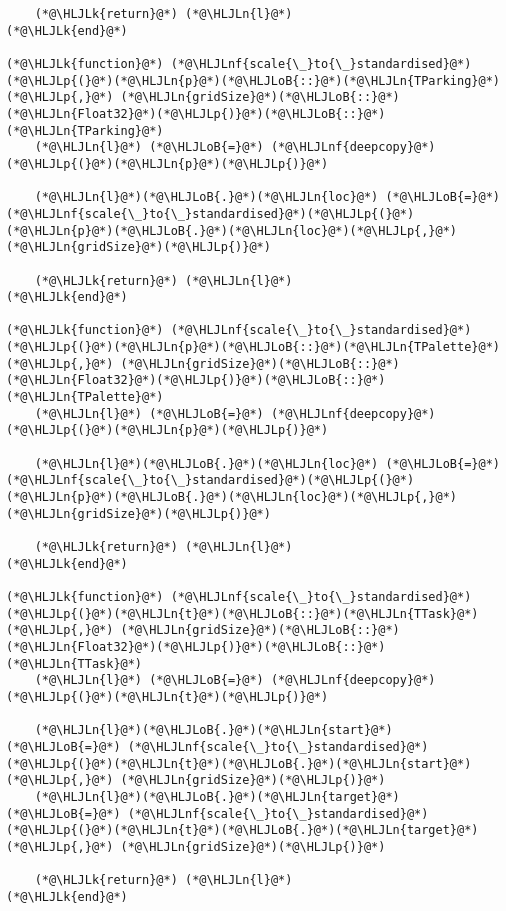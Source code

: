 \documentclass[12pt,a4paper]{article}
\newcommand{\HLJLk}[1]{\textcolor[RGB]{148,91,176}{\textbf{#1}}}
\newcommand{\HLJLn}[1]{#1}
\newcommand{\HLJLnf}[1]{\textcolor[RGB]{66,102,213}{#1}}
\newcommand{\HLJLoB}[1]{\textcolor[RGB]{102,102,102}{\textbf{#1}}}
\newcommand{\HLJLp}[1]{#1}
\begin{document}
\begin{lstlisting}
    (*@\HLJLk{return}@*) (*@\HLJLn{l}@*)
(*@\HLJLk{end}@*)

(*@\HLJLk{function}@*) (*@\HLJLnf{scale{\_}to{\_}standardised}@*)(*@\HLJLp{(}@*)(*@\HLJLn{p}@*)(*@\HLJLoB{::}@*)(*@\HLJLn{TParking}@*)(*@\HLJLp{,}@*) (*@\HLJLn{gridSize}@*)(*@\HLJLoB{::}@*)(*@\HLJLn{Float32}@*)(*@\HLJLp{)}@*)(*@\HLJLoB{::}@*)(*@\HLJLn{TParking}@*)
    (*@\HLJLn{l}@*) (*@\HLJLoB{=}@*) (*@\HLJLnf{deepcopy}@*)(*@\HLJLp{(}@*)(*@\HLJLn{p}@*)(*@\HLJLp{)}@*)

    (*@\HLJLn{l}@*)(*@\HLJLoB{.}@*)(*@\HLJLn{loc}@*) (*@\HLJLoB{=}@*) (*@\HLJLnf{scale{\_}to{\_}standardised}@*)(*@\HLJLp{(}@*)(*@\HLJLn{p}@*)(*@\HLJLoB{.}@*)(*@\HLJLn{loc}@*)(*@\HLJLp{,}@*) (*@\HLJLn{gridSize}@*)(*@\HLJLp{)}@*)

    (*@\HLJLk{return}@*) (*@\HLJLn{l}@*)
(*@\HLJLk{end}@*)

(*@\HLJLk{function}@*) (*@\HLJLnf{scale{\_}to{\_}standardised}@*)(*@\HLJLp{(}@*)(*@\HLJLn{p}@*)(*@\HLJLoB{::}@*)(*@\HLJLn{TPalette}@*)(*@\HLJLp{,}@*) (*@\HLJLn{gridSize}@*)(*@\HLJLoB{::}@*)(*@\HLJLn{Float32}@*)(*@\HLJLp{)}@*)(*@\HLJLoB{::}@*)(*@\HLJLn{TPalette}@*)
    (*@\HLJLn{l}@*) (*@\HLJLoB{=}@*) (*@\HLJLnf{deepcopy}@*)(*@\HLJLp{(}@*)(*@\HLJLn{p}@*)(*@\HLJLp{)}@*)

    (*@\HLJLn{l}@*)(*@\HLJLoB{.}@*)(*@\HLJLn{loc}@*) (*@\HLJLoB{=}@*) (*@\HLJLnf{scale{\_}to{\_}standardised}@*)(*@\HLJLp{(}@*)(*@\HLJLn{p}@*)(*@\HLJLoB{.}@*)(*@\HLJLn{loc}@*)(*@\HLJLp{,}@*) (*@\HLJLn{gridSize}@*)(*@\HLJLp{)}@*)

    (*@\HLJLk{return}@*) (*@\HLJLn{l}@*)
(*@\HLJLk{end}@*)

(*@\HLJLk{function}@*) (*@\HLJLnf{scale{\_}to{\_}standardised}@*)(*@\HLJLp{(}@*)(*@\HLJLn{t}@*)(*@\HLJLoB{::}@*)(*@\HLJLn{TTask}@*)(*@\HLJLp{,}@*) (*@\HLJLn{gridSize}@*)(*@\HLJLoB{::}@*)(*@\HLJLn{Float32}@*)(*@\HLJLp{)}@*)(*@\HLJLoB{::}@*)(*@\HLJLn{TTask}@*)
    (*@\HLJLn{l}@*) (*@\HLJLoB{=}@*) (*@\HLJLnf{deepcopy}@*)(*@\HLJLp{(}@*)(*@\HLJLn{t}@*)(*@\HLJLp{)}@*)

    (*@\HLJLn{l}@*)(*@\HLJLoB{.}@*)(*@\HLJLn{start}@*) (*@\HLJLoB{=}@*) (*@\HLJLnf{scale{\_}to{\_}standardised}@*)(*@\HLJLp{(}@*)(*@\HLJLn{t}@*)(*@\HLJLoB{.}@*)(*@\HLJLn{start}@*)(*@\HLJLp{,}@*) (*@\HLJLn{gridSize}@*)(*@\HLJLp{)}@*)
    (*@\HLJLn{l}@*)(*@\HLJLoB{.}@*)(*@\HLJLn{target}@*) (*@\HLJLoB{=}@*) (*@\HLJLnf{scale{\_}to{\_}standardised}@*)(*@\HLJLp{(}@*)(*@\HLJLn{t}@*)(*@\HLJLoB{.}@*)(*@\HLJLn{target}@*)(*@\HLJLp{,}@*) (*@\HLJLn{gridSize}@*)(*@\HLJLp{)}@*)

    (*@\HLJLk{return}@*) (*@\HLJLn{l}@*)
(*@\HLJLk{end}@*)


\end{lstlisting}
\end{document}
